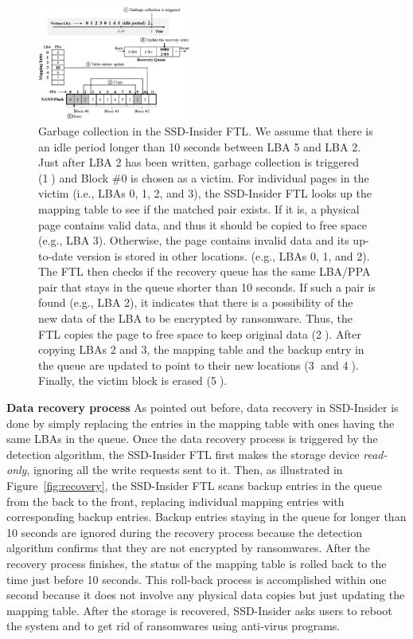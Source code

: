 \documentclass[conference]{IEEEtran}
\newcommand{\ours}{SSD-Insider}
\begin{document}
\begin{figure}
\centering
\includegraphics[width=0.45\textwidth]{fig/flash-fig4}
\caption{
Garbage collection in the \ours{} FTL. We assume that there is
an idle period longer than 10 seconds between LBA 5 and LBA 2. Just
after LBA 2 has been written, garbage collection is triggered
(\textcircled{1}) and Block \#0 is chosen as a victim. For
individual pages in the victim (i.e., LBAs 0, 1, 2, and 3), the
\ours{} FTL looks up the mapping table to see if the matched
pair exists.  If it is, a physical page contains valid data, and
thus it should be copied to free space (e.g., LBA 3).  Otherwise,
the page contains invalid data and its up-to-date version is stored
in other locations. (e.g., LBAs 0, 1, and 2).  The FTL then checks
if the recovery queue has the same LBA/PPA pair that stays in the
queue shorter than 10 seconds.  If such a pair is found (e.g., LBA
2), it indicates that there is a possibility of the new data of the
LBA to be encrypted by ransomware.  Thus, the FTL copies the page
to free space to keep original data (\textcircled{2}).  After
copying LBAs 2 and 3, the mapping table and the backup entry in the
queue are updated to point to their new locations (\textcircled{3}
and \textcircled{4}).  Finally, the victim block is erased
(\textcircled{5}).
}
\label{fig:gc}
\end{figure}


{\bf Data recovery process} 
As pointed out before, data recovery in \ours{} is done by
simply replacing the entries in the mapping table with ones having the same LBAs
in the queue.  Once the data recovery process is
triggered by the detection algorithm, the \ours{} FTL first makes the
storage device \textit{read-only}, ignoring all the write requests
sent to it.  Then, as illustrated in Figure~\ref{fig:recovery}, the
\ours{} FTL scans backup entries in the queue from the back to
the front, replacing individual mapping entries with corresponding
backup entries.  Backup entries staying in the queue for longer
than 10 seconds are ignored during the recovery process because the
detection algorithm confirms that they are not encrypted by
ransomwares.  After the recovery process finishes, the status of
the mapping table is rolled back to the time just before 10
seconds.  This roll-back process is accomplished within one second
because it does not involve any physical data copies but just updating the mapping table. 
After the storage is recovered, \ours{} asks users to reboot the system
and to get rid of ransomwares using anti-virus programs.
\end{document}
